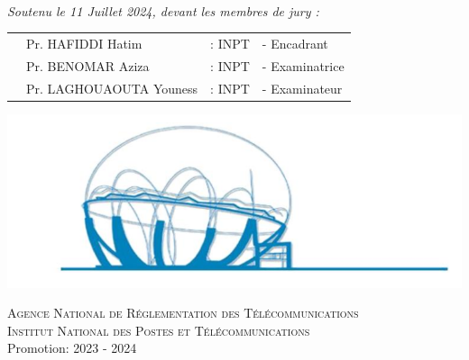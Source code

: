 \begin{titlepage}
\begin{minipage}{0.9\textwidth}
\begin{flushleft}
  \end{flushleft}
\end{minipage}

\begin{minipage}{0.4\textwidth}
\end{minipage}\\[0.2cm]
{\large \textit{Soutenu le 11 Juillet 2024, devant les membres de jury : }}\\[0.5cm]
\centering

\begin{tabular}{p{2.8cm}lll}
    & \large Pr. HAFIDDI Hatim & \large : INPT & \large - Encadrant \\[0.1cm]
    & \large Pr. BENOMAR Aziza  & \large : INPT & \large - Examinatrice  \\[0.1cm]
    & \large Pr. LAGHOUAOUTA Youness & \large : INPT & \large - Examinateur \\[0.1cm]
 
\end{tabular}




\includegraphics[scale=0.8]{Images/ZLAFA.png}


\textsc{Agence National de Réglementation des Télécommunications}\\
\textsc{Institut National des Postes et Télécommunications}\\
\vspace{0.5cm}
{\large Promotion: 2023 - 2024}

\end{titlepage}